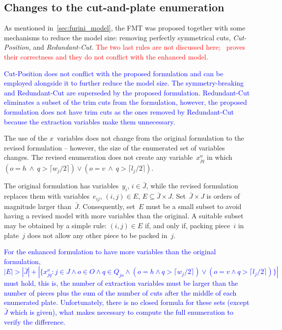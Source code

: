 \documentclass[ppgc,tese,english,formais,babel]{iiufrgs}
\newif\iffinalversion
\newcommand{\newtext}[1]{\iffinalversion%
#1%
\else%
\textcolor{blue}{#1}%
\fi%
}
\newcommand{\oldtext}[1]{\iffinalversion%
\else%
\textcolor{red}{#1}%
\fi%
}
\begin{document}
\subsection{Changes to the cut-and-plate enumeration}
\label{sec:var_enum}

As mentioned in~\cref{sec:furini_model}, the FMT was proposed together with some mechanisms to reduce the model size: removing perfectly symmetrical cuts, \emph{Cut-Position}, and \emph{Redundant-Cut}.
\oldtext{The two last rules are not discussed here; \citet{furini:2016}~proves their correctness and they do not conflict with the enhanced model.}
\newtext{
Cut-Position does not conflict with the proposed formulation and can be employed alongside it to further reduce the model size.
The symmetry-breaking and Redundant-Cut are superseded by the proposed formulation.
Redundant-Cut eliminates a subset of the trim cuts from the formulation, however, the proposed formulation does not have trim cuts as the ones removed by Redundant-Cut because the extraction variables make them unnecessary.
}

The use of the \(x\)~variables does not change from the original formulation to the revised formulation -- however, the size of the enumerated set of variables changes.
The revised enumeration does not create any variable~\(x^o_{jq}\) in which \((o = h~\land~q > \lceil w_j / 2 \rceil) \lor (o = v~\land~q > \lceil l_j / 2 \rceil)\).

The original formulation has variables~\(y_i\), \(i \in \bar{J}\), while the revised formulation replaces them with variables~\(e_{ij}\), \((i, j) \in E\), \(E \subseteq \bar{J} \times J\).
Set~\(\bar{J} \times J\) is orders of magnitude larger than~\(\bar{J}\).
Consequently, set~\(E\) must be a small subset to avoid having a revised model with more variables than the original.
A suitable subset may be obtained by a simple rule: \((i, j) \in E\) if, and only if, packing piece~\(i\) in plate~\(j\) does not allow any other piece to be packed in~\(j\).

\newtext{
For the enhanced formulation to have more variables than the original formulation, \(|E| > |\bar{J}| + |\{x^o_{jq} : j \in J \land o \in O \land q \in Q_{jo} \land (o = h \land q > \lceil w_j / 2 \rceil) \lor (o = v \land q > \lceil l_j / 2 \rceil)\}|\) must hold, this is, the number of extraction variables must be larger than the number of pieces plus the sum of the number of cuts after the middle of each enumerated plate.
Unfortunately, there is no closed formula for these sets (except \(\bar{J}\) which is given), what makes necessary to compute the full enumeration to verify the difference.
}
\end{document}
